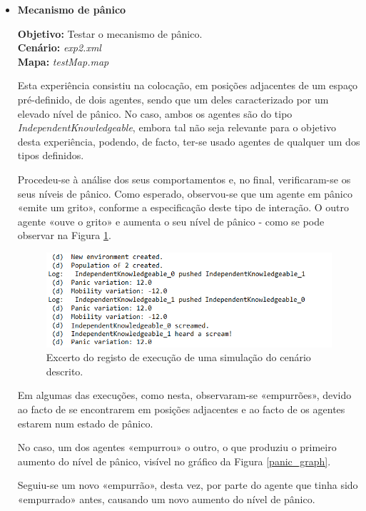 \documentclass[12pt]{article}
\begin{document}
\begin{titlepage}
\begin{itemize}
	
	\item \textbf{Mecanismo de pânico}
	
	\textbf{Objetivo:} 
	Testar o mecanismo de pânico.
	\\\textbf{Cenário:} 
	\textit{exp2.xml}	
\\\textbf{Mapa:} 
\textit{testMap.map}
	
	Esta experiência consistiu na colocação, em posições adjacentes de um espaço pré-definido, de dois agentes, sendo que um deles caracterizado por um elevado nível de pânico. No caso, ambos os agentes são do tipo \textit{IndependentKnowledgeable}, embora tal não seja relevante para o objetivo desta experiência, podendo, de facto, ter-se usado agentes de qualquer um dos tipos definidos.
	
	Procedeu-se à análise dos seus comportamentos e, no final, verificaram-se os seus níveis de pânico. 
		Como esperado, observou-se que um agente em pânico «emite um grito», conforme a especificação deste tipo de interação. O outro agente «ouve o grito» e aumenta o seu nível de pânico - como se pode observar na Figura \ref{panic_log}.
	
	\begin{figure}[H]
		\centering
		\includegraphics{panic_log.png}
		\caption{Excerto do registo de execução de uma simulação do cenário descrito.}
		\label{panic_log}
	\end{figure}

	Em algumas das execuções, como nesta, observaram-se «empurrões», devido ao facto de se encontrarem em posições adjacentes e ao facto de os agentes estarem num estado de pânico. 
	
	No caso, um dos agentes «empurrou» o outro, o que produziu o primeiro aumento do nível de pânico, visível no gráfico da Figura \ref{panic_graph}. 
	
	Seguiu-se um novo «empurrão», desta vez, por parte do agente que tinha sido «empurrado» antes, causando um novo aumento do nível de pânico. 
	

\end{itemize}
\end{titlepage}
\end{document}
